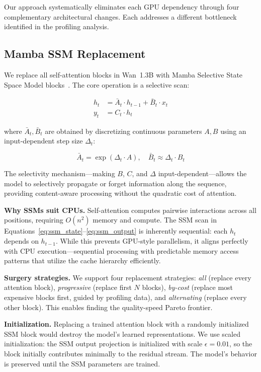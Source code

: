 \documentclass[11pt]{article}
\begin{document}
Our approach systematically eliminates each GPU dependency through four complementary architectural changes. Each addresses a different bottleneck identified in the profiling analysis.

\subsection{Mamba SSM Replacement}
\label{sec:mamba}

We replace all self-attention blocks in Wan~1.3B with Mamba Selective State Space Model blocks~\citep{gu2023mamba}. The core operation is a selective scan:

\begin{align}
  h_t &= \bar{A}_t \cdot h_{t-1} + \bar{B}_t \cdot x_t \label{eq:ssm_state}\\
  y_t &= C_t \cdot h_t \label{eq:ssm_output}
\end{align}

where $\bar{A}_t, \bar{B}_t$ are obtained by discretizing continuous parameters $A, B$ using an input-dependent step size $\Delta_t$:

\begin{equation}
  \bar{A}_t = \exp(\Delta_t \cdot A), \quad \bar{B}_t \approx \Delta_t \cdot B_t
\end{equation}

The selectivity mechanism---making $B$, $C$, and $\Delta$ input-dependent---allows the model to selectively propagate or forget information along the sequence, providing content-aware processing without the quadratic cost of attention.

\textbf{Why SSMs suit CPUs.} Self-attention computes pairwise interactions across all positions, requiring $O(n^2)$ memory and compute. The SSM scan in Equations~\ref{eq:ssm_state}--\ref{eq:ssm_output} is inherently sequential: each $h_t$ depends on $h_{t-1}$. While this prevents GPU-style parallelism, it aligns perfectly with CPU execution---sequential processing with predictable memory access patterns that utilize the cache hierarchy efficiently.

\textbf{Surgery strategies.} We support four replacement strategies: \emph{all} (replace every attention block), \emph{progressive} (replace first $N$ blocks), \emph{by-cost} (replace most expensive blocks first, guided by profiling data), and \emph{alternating} (replace every other block). This enables finding the quality-speed Pareto frontier.

\textbf{Initialization.} Replacing a trained attention block with a randomly initialized SSM block would destroy the model's learned representations. We use scaled initialization: the SSM output projection is initialized with scale $\epsilon = 0.01$, so the block initially contributes minimally to the residual stream. The model's behavior is preserved until the SSM parameters are trained.
\end{document}
